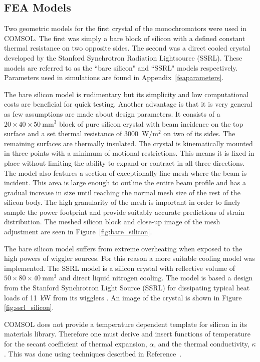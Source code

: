 \documentclass{iucr}
\begin{document}
\subsection{FEA Models}

Two geometric models for the first crystal of the monochromators were used in COMSOL. The first was simply a bare block of silicon with a defined constant thermal resistance on two opposite sides. The second was a direct cooled crystal developed by the Stanford Synchrotron Radiation Lightsource (SSRL). These models are referred to as the ``bare silicon" and ``SSRL" models respectively. Parameters used in simulations are found in Appendix~\ref{feaparameters}.

The bare silicon model is rudimentary but its simplicity and low computational costs are beneficial for quick testing. Another advantage is that it is very general as few assumptions are made about design parameters. It consists of a $20\times 40\times 50~$mm$^3$ block of pure silicon crystal with beam incidence on the top surface and a set thermal resistance of 3000~W/m$^2$ on two of its sides. The remaining surfaces are thermally insulated. The crystal is kinematically mounted in three points with a minimum of motional restrictions. This means it is fixed in place without limiting the ability to expand or contract in all three directions. The model also features a section of exceptionally fine mesh where the beam is incident. This area is large enough to outline the entire beam profile and has a gradual increase in size until reaching the normal mesh size of the rest of the silicon body. The high granularity of the mesh is important in order to finely sample the power footprint and provide suitably accurate predictions of strain distribution. The meshed silicon block and close-up image of the mesh adjustment are seen in Figure~\ref{fig:bare_silicon}.

The bare silicon model suffers from extreme overheating when exposed to the high powers of wiggler sources. For this reason a more suitable cooling model was implemented. The SSRL model is a silicon crystal with reflective volume of $50\times 80\times 40~$mm$^3$ and direct liquid nitrogen cooling. The model is based a design from the Stanford Synchrotron Light Source (SSRL) for dissipating typical heat loads of 11~kW from its wigglers \cite{stanford}. An image of the crystal is shown in Figure \ref{fig:ssrl_silicon}.

COMSOL does not provide a temperature dependent template for silicon in its materials library. Therefore one must derive and insert functions of temperature for the secant coefficient of thermal expansion, $\alpha$, and the thermal conductivity, $\kappa$. This was done using techniques described in Reference~\cite{mash}.
\end{document}
